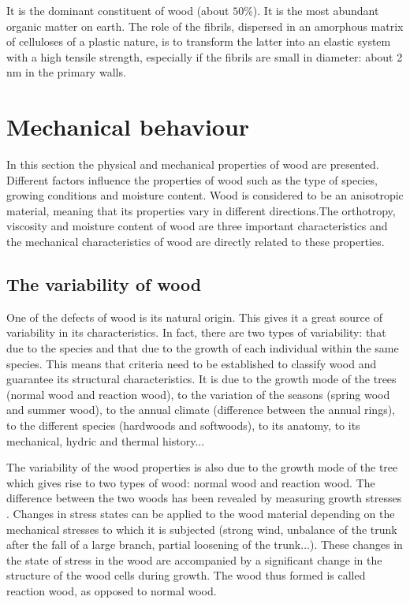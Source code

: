 It is the dominant constituent of wood (about $50 \%$). It is the most abundant organic matter on earth. The role of the fibrils, dispersed in an amorphous matrix of celluloses of a plastic nature, is to transform the latter into an elastic system with a high tensile strength, especially if the fibrils are small in diameter: about 2 nm in the primary walls.

\section{Mechanical behaviour}

In this section the physical and mechanical properties of wood are presented. Different factors influence the properties of wood such as the type of species, growing conditions and moisture content. Wood is considered to be an anisotropic material, meaning that its properties vary in different directions.The orthotropy, viscosity and moisture content of wood are three important characteristics and the mechanical characteristics of wood are directly related to these properties.

\subsection{The variability of wood}

One of the defects of wood is its natural origin. This gives it a great source of variability in its characteristics. In fact, there are two types of variability: that due to the species and that due to the growth of each individual within the same species. This means that criteria need to be established to classify wood and guarantee its structural characteristics. It is due to the growth mode of the trees (normal wood and reaction wood), to the variation of the seasons (spring wood and summer wood), to the annual climate (difference between the annual rings), to the different species (hardwoods and softwoods), to its anatomy, to its mechanical, hydric and thermal history...

The variability of the wood properties is also due to the growth mode of the tree which gives rise to two types of wood: normal wood and reaction wood. The difference between the two woods has been revealed by measuring growth stresses \cite{BrunoClair2003-2004}. Changes in stress states can be applied to the wood material depending on the mechanical stresses to which it is subjected (strong wind, unbalance of the trunk after the fall of a large branch, partial loosening of the trunk...). These changes in the state of stress in the wood are accompanied by a significant change in the structure of the wood cells during growth. The wood thus formed is called reaction wood, as opposed to normal wood.

